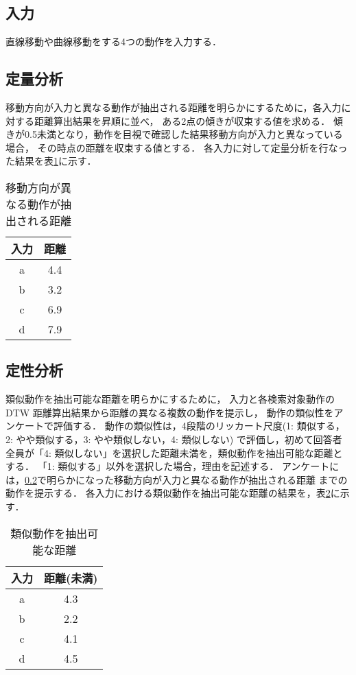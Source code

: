 \documentclass[twocolumn]{jarticle} %
\begin{document}
\subsection{入力}
直線移動や曲線移動をする4つの動作を入力する．

\subsection{定量分析}
\label{teiryou}
移動方向が入力と異なる動作が抽出される距離を明らかにするために，各入力に対する距離算出結果を昇順に並べ，
ある2点の傾きが収束する値を求める．
傾きが0.5未満となり，動作を目視で確認した結果移動方向が入力と異なっている場合，
その時点の距離を収束する値とする．
各入力に対して定量分析を行なった結果を表\ref{quantitativeresult}に示す．
        
\begin{table}[H]
    \caption{移動方向が異なる動作が抽出される距離}
    \label{quantitativeresult}
    \centering
    \begin{tabular}{c|c}
    \hline
    入力 & 距離 \\
    \hline \hline
    a & 4.4 \\
    \hline
    b & 3.2 \\
    \hline
    c & 6.9 \\
    \hline
    d & 7.9 \\
    \hline
    \end{tabular}
\end{table}

\subsection{定性分析}
\label{teisei}
類似動作を抽出可能な距離を明らかにするために，
入力と各検索対象動作の DTW 距離算出結果から距離の異なる複数の動作を提示し，
動作の類似性をアンケートで評価する．
動作の類似性は，4段階のリッカート尺度(1: 類似する，2: やや類似する，3: やや類似しない，4: 類似しない)
で評価し，初めて回答者全員が「4: 類似しない」を選択した距離未満を，類似動作を抽出可能な距離とする．
「1: 類似する」以外を選択した場合，理由を記述する．
アンケートには，\ref{teiryou}で明らかになった移動方向が入力と異なる動作が抽出される距離
までの動作を提示する．
各入力における類似動作を抽出可能な距離の結果を，表\ref{result}に示す．

\begin{table}[H]
    \caption{類似動作を抽出可能な距離}
    \label{result}
    \centering
    \begin{tabular}{c|c}
    \hline
    入力 & 距離(未満) \\
    \hline \hline
    a & 4.3 \\
    \hline
    b & 2.2 \\
    \hline
    c & 4.1 \\
    \hline
    d & 4.5 \\
    \hline
    \end{tabular}
\end{table}
\end{document}

